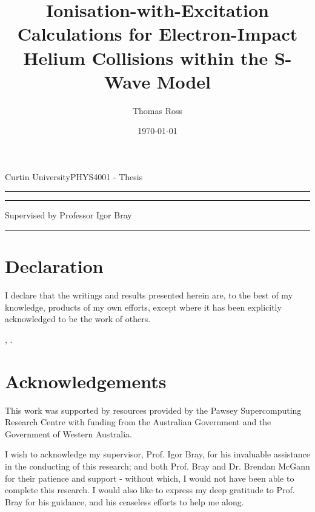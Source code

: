 \documentclass[]{article}
\title{Ionisation-with-Excitation Calculations for Electron-Impact Helium
  Collisions within the S-Wave Model}
\author{Thomas Ross}
\date{\today}
\gdef\theassessment{PHYS4001 - Thesis}
\gdef\thesupervisor{Professor Igor Bray}
\gdef\theinstitution{Curtin University}
\def\frontmatter{%
    \pagenumbering{roman}
    \setcounter{page}{1}
    \renewcommand{\thesection}{\Roman{section}}
}%
\begin{document}

\begin{titlepage}
  \begin{flushleft}
    \theinstitution \hfill \theassessment
  \end{flushleft}
  \hrule
  \begin{center}
    {\huge{\thetitle}\par}
    {\rule[1.0pt]{8.5cm}{0.4pt}\par}
    {\Large{\theauthor}\par}
    {\Large{Supervised by \thesupervisor}\par}
  \end{center}
  \hrule
  \vspace*{\fill}
  \begin{center}
  \end{center}
\end{titlepage}

\clearpage

\frontmatter

\section*{Declaration}

I declare that the writings and results presented herein are, to the best of my
knowledge, products of my own efforts, except where it has been explicitly
acknowledged to be the work of others.

\theauthor, \thedate.

\section*{Acknowledgements}

This work was supported by resources provided by the Pawsey Supercomputing
Research Centre with funding from the Australian Government and the Government
of Western Australia.

I wish to acknowledge my supervisor, Prof. Igor Bray, for his invaluable
assistance in the conducting of this research; and both Prof. Bray and
Dr. Brendan McGann for their patience and support - without which, I would not
have been able to complete this research.
I would also like to express my deep gratitude to Prof. Bray for his guidance,
and his ceaseless efforts to help me along.

\clearpage

\tableofcontents
\end{document}
